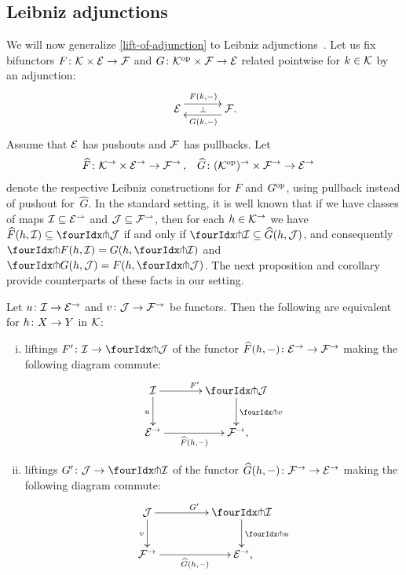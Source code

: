 \documentclass[reqno,10pt,a4paper,oneside,draft]{amsart}
\begin{document}
\subsection*{Leibniz adjunctions}

We will now generalize \cref{lift-of-adjunction} to Leibniz adjunctions~\cite{riehl-verity:reedy}.
Let us fix bifunctors $F \co \cal{K} \times \catE \to \cal{F}$ and $G \co \cal{K}^{\op} \times \cal{F} \to \catE$ related pointwise for $k \in \cal{K}$ by an adjunction:
\[
\xymatrix@C+1em{
  \catE
  \ar@<5pt>[r]^{F(k, \arghole)}
  \ar@{}[r]|{\bot}
&
  \cal{F} \rlap{.}
  \ar@<5pt>[l]^{G(k, \arghole)}
}
\]
Assume that $\catE$ has pushouts and $\cal{F}$ has pullbacks.
Let
\[
\begin{aligned}
  \widehat{F} &\co \cal{K}^\to \times \catE^\to \to \cal{F}^\to
\, ,&
  \widehat{G} &\co (\cal{K}^{\op})^\to \times \cal{F}^\to \to \catE^\to
\end{aligned}
\]
denote the respective Leibniz constructions for $F$ and $G^{\op}$, using pullback instead of pushout for~$\widehat{G}$.
In the standard setting, it is well known that if we have classes of maps $\cal{I} \subseteq \catE^\to$ and $\cal{J} \subseteq \cal{F}^\to$, then for each $h \in \cal{K}^\to$ we have $\widehat{F}(h, \cal{I}) \subseteq \liftl{\cal{J}}$ if and only if $\liftr{\cal{I}} \subseteq \widehat{G}(h, \cal{J})$, and consequently $\liftr{F(h, \cal{I})} = G(h, \liftr{\cal{I}})$ and $\liftl{G(h, \cal{J})} = F(h, \liftl{\cal{J}})$.
The next proposition and corollary provide counterparts of these facts in our setting.

\begin{proposition} \label{lift-of-leibniz-adjunction}
Let $u \co \cal{I} \to \catE^\to$ and $v \co \cal{J} \to \cal{F}^\to$ be functors.
Then the following are equivalent for $h \co X \to Y$ in $\cal{K}$:
\begin{enumerate}[(i)]
\item liftings $F' \co \cal{I} \to \liftl{\cal{J}}$ of the functor $\widehat{F}(h, \arghole) \co \catE^\to \to \cal{F}^\to$ making the following diagram commute:
\[
\xymatrix@C=1.2cm{
  \cal{I}
  \ar[r]^{F'}
  \ar[d]_{u}
&
  \liftl{\cal{J}}
  \ar[d]^{\liftl{v}}
\\
  \catE^\to
  \ar[r]_-{\widehat{F}(h, \arghole)}
&
  \cal{F}^\to
\rlap{,}}
\]
\item liftings $G' \co \cal{J} \to \liftr{\cal{I}}$ of the functor $\widehat{G}(h, \arghole) \co \cal{F}^\to \to \catE^\to$ making the following diagram commute:
\[
\xymatrix@C+2em{
    \cal{J}
      \ar[d]_{v}
      \ar[r]^{G'}
&
  \liftr{\cal{I}}
    \ar[d]^{\liftr{u}}
\\
  \cal{F}^\to
   \ar[r]_-{\widehat{G}(h, \arghole)}
&
  \catE^\to
\rlap{,}}
\]
\end{enumerate}
\end{proposition}
\end{document}
